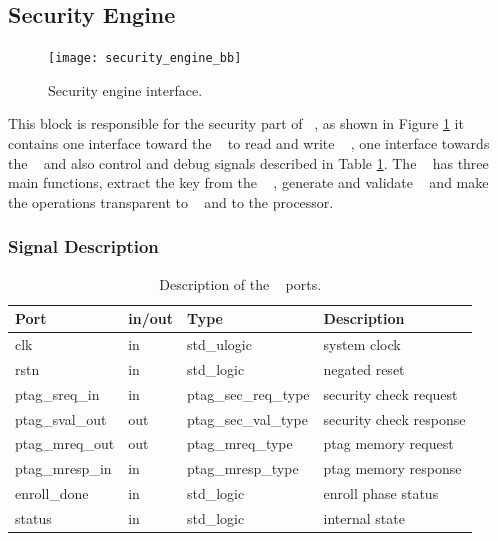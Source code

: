 \subsection{Security Engine}
\label{sec:secengine}

\begin{figure}[!ht]
	\centering
	\texttt{[image: security\_engine\_bb]}
    \caption{Security engine interface.  }
	\label{fig:sebb}
\end{figure}


This block is responsible for the security part of \cshia~,  as shown in Figure \ref{fig:sebb} it contains one interface toward the \ptagmem~ to read and write \ptags~ , one interface towards the \handler~  and also control and debug signals described in Table \ref{table:seports}.  The \seceng~ has three main  functions, extract the key  from the \puf~ , generate and validate \ptags~ and  make the \ptagmem operations transparent to \handler~ and to the processor.




\subsubsection{Signal Description}
\begin{table}[H]
    \centering
    \begin{tabular}{l l l l}
    
        \textbf{Port}   & \textbf{in/out} & \textbf{Type}        & \textbf{Description} 	\\ \hline \hline
        clk             & in              & std\_ulogic          & system clock         	\\ \hline
        rstn            & in              & std\_logic           & negated reset         	\\ \hline
        ptag\_sreq\_in  & in              & ptag\_sec\_req\_type & security check request    	\\ \hline
        ptag\_sval\_out & out             & ptag\_sec\_val\_type & security check response  	\\ \hline
        ptag\_mreq\_out & out             & ptag\_mreq\_type 	 & ptag memory  request    	\\ \hline
        ptag\_mresp\_in & in              & ptag\_mresp\_type 	 & ptag memory  response  	\\ \hline
        enroll\_done    & in              &  std\_logic      	 & enroll phase status  	\\ \hline
        status          & in              &  std\_logic      	 & internal state 	\\ \hline
        
    \end{tabular}
    \caption{Description of the \seceng~ ports.}
    \label{table:seports}
\end{table}





